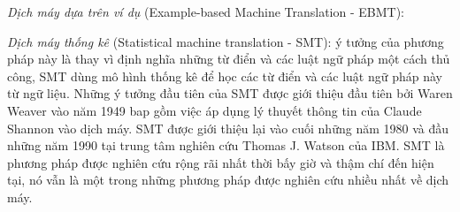 \textit{Dịch máy dựa trên ví dụ} (Example-based Machine Translation - EBMT): 

\textit{Dịch máy thống kê} (Statistical machine translation - SMT): ý tưởng của phương pháp này là thay vì định nghĩa những từ điển và các luật ngữ pháp một cách thủ công, SMT dùng mô hình thống kê để học các từ điển và các luật ngữ pháp này từ ngữ liệu. Những ý tưởng đầu tiên của SMT được giới thiệu đầu tiên bởi Waren Weaver vào năm 1949 bap gồm việc áp dụng lý thuyết thông tin của Claude Shannon vào dịch máy. SMT được giới thiệu lại vào cuối những năm 1980 và đầu những năm 1990 tại trung tâm nghiên cứu Thomas J. Watson của IBM. SMT là phương pháp được nghiên cứu rộng rãi nhất thời bấy giờ và thậm chí đến hiện tại, nó vẫn là một trong những phương pháp được nghiên cứu nhiều nhất về dịch máy. 

